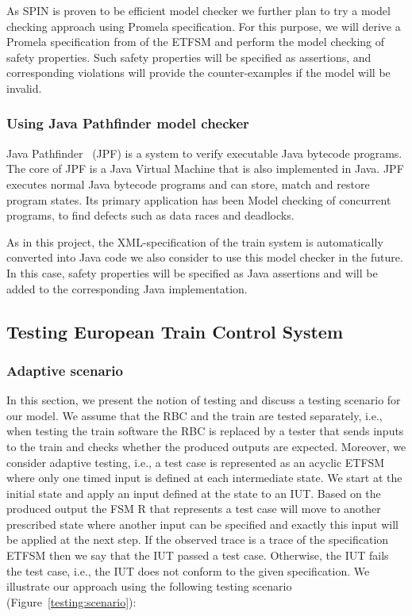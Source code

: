 \documentclass{template/openetcs_article}
\begin{document}
As SPIN is proven to be efficient model checker we further plan to try a model checking approach using Promela specification. For this purpose, we will derive a Promela specification from of the ETFSM and perform the model checking of safety properties. Such safety properties will be specified as assertions, and corresponding violations will provide the counter-examples if the model will be invalid.

\subsubsection{Using Java Pathfinder model checker}

Java Pathfinder~\cite{JPF} (JPF) is a system to verify executable Java bytecode programs. The core of JPF is a Java Virtual Machine that is also implemented in Java. JPF executes normal Java bytecode programs and can store, match and restore program states. Its primary application has been Model checking of concurrent programs, to find defects such as data races and deadlocks. 

As in this project, the XML-specification of the train system is automatically converted into Java code we also consider to use this model checker in the future. In this case, safety properties will be specified as Java assertions and will be added to the corresponding Java implementation. 

\subsection{Testing European Train Control System}\label{sec5}

\subsubsection{Adaptive scenario} 

In this section, we present the notion of testing and discuss a testing scenario for our model. We assume that the RBC and the train are tested separately, i.e., when testing the train software the RBC is replaced by a tester that sends inputs to the train and checks whether the produced outputs are expected. Moreover, we consider adaptive testing, i.e., a test case is represented as an acyclic ETFSM~\cite{Petrenko2011,offutt1989coupling} where only one timed input is defined at each intermediate state. We start at the initial state and apply an input defined at the state to an IUT. Based on the produced output the FSM R that represents a test case will move to another prescribed state where another input can be specified and exactly this input will be applied at the next step.  If the observed trace is a trace of the specification ETFSM then we say that the IUT passed a test case. Otherwise, the IUT fails the test case, i.e., the IUT does not conform to the given specification. We illustrate our approach using the following testing scenario (Figure~\ref{testing:scenario}):
\end{document}
